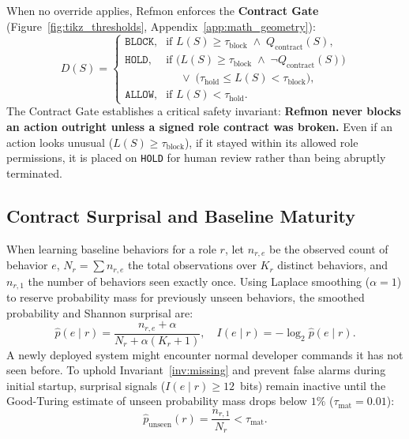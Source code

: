 \documentclass[10pt,twocolumn,letterpaper]{article}
\makeatletter
\theoremstyle{plain}
\theoremstyle{definition}
\theoremstyle{remark}
\DeclareRobustCommand{\_}{\ifmmode\nfss@text{\textunderscore}\else\textunderscore\penalty\@highpenalty\hskip\z@skip\fi}
\makeatother
\begin{document}
When no override applies, Refmon enforces the \textbf{Contract Gate} (Figure~\ref{fig:tikz_thresholds}, Appendix~\ref{app:math_geometry}):
\begin{equation}
  D(S) =
  \begin{cases}
    \texttt{BLOCK}, & \text{if } L(S) \ge \tau_{\text{block}} \;\land\; Q_{\text{contract}}(S),\\
    \texttt{HOLD},  & \text{if } \big(L(S) \ge \tau_{\text{block}} \;\land\; \neg Q_{\text{contract}}(S)\big)\\
                    & \quad\;\lor\; \big(\tau_{\text{hold}} \le L(S) < \tau_{\text{block}}\big),\\
    \texttt{ALLOW}, & \text{if } L(S) < \tau_{\text{hold}}.
  \end{cases}
  \label{eq:decide}
\end{equation}
The Contract Gate establishes a critical safety invariant: \textbf{Refmon never blocks an action outright unless a signed role contract was broken.} Even if an action looks unusual ($L(S) \ge \tau_{\text{block}}$), if it stayed within its allowed role permissions, it is placed on \texttt{HOLD} for human review rather than being abruptly terminated.

\subsection{Contract Surprisal and Baseline Maturity}
\label{sec:rarity}

When learning baseline behaviors for a role $r$, let $n_{r,e}$ be the observed count of behavior $e$, $N_r = \sum n_{r,e}$ the total observations over $K_r$ distinct behaviors, and $n_{r,1}$ the number of behaviors seen exactly once. Using Laplace smoothing ($\alpha = 1$) to reserve probability mass for previously unseen behaviors, the smoothed probability and Shannon surprisal are:
\begin{equation}
  \hat{p}(e \mid r) = \frac{n_{r,e} + \alpha}{N_r + \alpha(K_r + 1)}, \quad
  I(e \mid r) = -\log_2 \hat{p}(e \mid r).
  \label{eq:surprisal}
\end{equation}
A newly deployed system might encounter normal developer commands it has not seen before. To uphold Invariant~\ref{inv:missing} and prevent false alarms during initial startup, surprisal signals ($I(e \mid r) \ge 12$~bits) remain inactive until the Good-Turing estimate of unseen probability mass drops below $1\%$ ($\tau_{\text{mat}} = 0.01$):
\begin{equation}
  \hat{p}_{\text{unseen}}(r) = \frac{n_{r,1}}{N_r} < \tau_{\text{mat}}.
  \label{eq:goodturing}
\end{equation}
\end{document}
